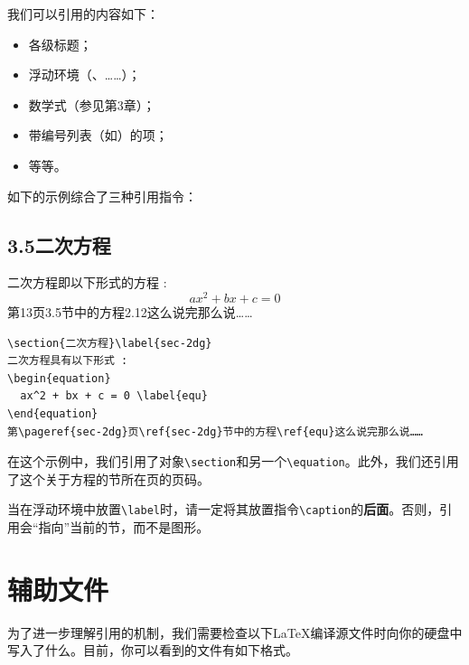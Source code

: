 我们可以引用的内容如下：

\begin{itemize}
  \item 各级标题；
  \item 浮动环境（、……）；
  \item 数学式（参见第3章）；
  \item 带编号列表（如）的项；
  \item 等等。
\end{itemize}

如下的示例综合了三种引用指令：

\begin{codelist}[2.21]{
  \section*{3.5\quad 二次方程}
二次方程即以下形式的方程 :
\begin{equation}
  ax^2 + bx + c = 0 \tag{2.12}
\end{equation}
第13页3.5节中的方程2.12这么说完那么说……
}\begin{verbatim}
\section{二次方程}\label{sec-2dg}
二次方程具有以下形式 :
\begin{equation}
  ax^2 + bx + c = 0 \label{equ}
\end{equation}
第\pageref{sec-2dg}页\ref{sec-2dg}节中的方程\ref{equ}这么说完那么说……
\end{verbatim}
\end{codelist}

在这个示例中，我们引用了对象\verb|\section|和另一个\verb|\equation|。此外，我们还引用了这个关于方程的节所在页的页码。

\begin{exclamation}
当在浮动环境中放置\verb|\label|时，请一定将其放置指令\verb|\caption|的\textbf{后面}。否则，引用会“指向”当前的节，而不是图形。
\end{exclamation}

\section{辅助文件}

为了进一步理解引用的机制，我们需要检查以下\LaTeX 编译源文件时向你的硬盘中写入了什么。目前，你可以看到的文件有如下格式。

